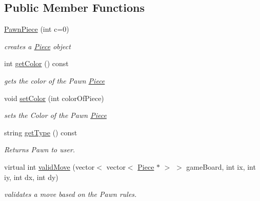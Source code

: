 \subsection*{Public Member Functions}
\begin{DoxyCompactItemize}
\item 
\hypertarget{classPawnPiece_ab4120d3c4881559475326efdb1348d45}{
\hyperlink{classPawnPiece_ab4120d3c4881559475326efdb1348d45}{PawnPiece} (int c=0)}
\label{classPawnPiece_ab4120d3c4881559475326efdb1348d45}

\begin{DoxyCompactList}\small\item\em creates a \hyperlink{classPiece}{Piece} object \item\end{DoxyCompactList}\item 
int \hyperlink{classPawnPiece_abe56912427ff110820b34223e5f60cda}{getColor} () const 
\begin{DoxyCompactList}\small\item\em gets the color of the Pawn \hyperlink{classPiece}{Piece} \item\end{DoxyCompactList}\item 
void \hyperlink{classPawnPiece_a5cfd7bce3cea8ad32c1b8dc8f5c7b253}{setColor} (int colorOfPiece)
\begin{DoxyCompactList}\small\item\em sets the Color of the Pawn \hyperlink{classPiece}{Piece} \item\end{DoxyCompactList}\item 
string \hyperlink{classPawnPiece_a0a612a59fd7bb512805329902e829ce6}{getType} () const 
\begin{DoxyCompactList}\small\item\em Returns Pawn to user. \item\end{DoxyCompactList}\item 
virtual int \hyperlink{classPawnPiece_a693be3f65626d084104215482619efbf}{validMove} (vector$<$ vector$<$ \hyperlink{classPiece}{Piece} $\ast$ $>$ $>$ gameBoard, int ix, int iy, int dx, int dy)
\begin{DoxyCompactList}\small\item\em validates a move based on the Pawn rules. \item\end{DoxyCompactList}\end{DoxyCompactItemize}


